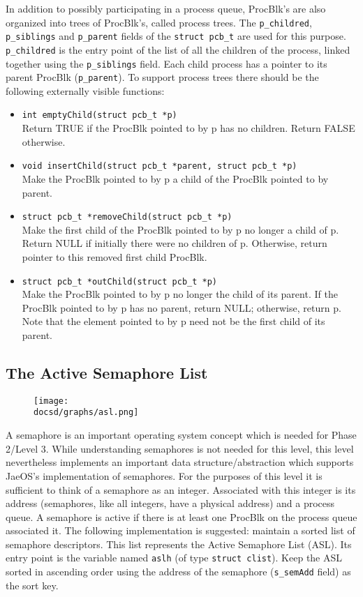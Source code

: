 In addition to possibly participating in a process queue, ProcBlk’s are also organized into trees of ProcBlk’s, called process trees. 
The \verb+p_childred+, \verb+p_siblings+ and \verb+p_parent+ fields of the \verb+struct pcb_t+ are used for this purpose. 
\verb+p_childred+ is the entry point of the list of all the children of the process, linked together using the \verb+p_siblings+ field.
Each child process has a pointer to its parent ProcBlk (\verb+p_parent+).
To support process trees there should be the following externally visible functions:
\begin{itemize}
	\item \verb+int emptyChild(struct pcb_t *p)+\\
		Return TRUE if the ProcBlk pointed to by p has no children. 
		Return FALSE otherwise.
	\item \verb+void insertChild(struct pcb_t *parent, struct pcb_t *p)+\\
		Make the ProcBlk pointed to by p a child of the ProcBlk pointed to by parent.
	\item \verb+struct pcb_t *removeChild(struct pcb_t *p)+\\
		Make the first child of the ProcBlk pointed to by p no longer a child of p.
		Return NULL if initially there were no children of p. 
		Otherwise, return pointer to this removed first child ProcBlk.
	\item \verb+struct pcb_t *outChild(struct pcb_t *p)+\\
		Make the ProcBlk pointed to by p no longer the child of its parent. 
		If the ProcBlk pointed to by p has no parent, return NULL; otherwise, return p. 
		Note that the element pointed to by p need not be the first child of its parent.
\end{itemize}

\subsection{The Active Semaphore List}

\begin{figure}[htbp]
	\centering
	\texttt{[image: \\docsd/graphs/asl.png]}
	\caption*{}
\end{figure}

A semaphore is an important operating system concept which is needed for Phase 2/Level 3. 
While understanding semaphores is not needed for this level, this level nevertheless implements an important data structure/abstraction which supports JaeOS’s implementation of semaphores. 
For the purposes of this level it is sufficient to think of a semaphore as an integer. 
Associated with this integer is its address (semaphores, like all integers, have a physical address) and a process queue. 
A semaphore is active if there is at least one ProcBlk on the process queue associated it. 
The following implementation is suggested: maintain a sorted list of semaphore descriptors. 
This list represents the Active Semaphore List (ASL). Its entry point is the variable named \verb+aslh+ (of type \verb+struct clist+). 
Keep the ASL sorted in ascending order using the address of the semaphore (\verb+s_semAdd+ field) as the sort key.

